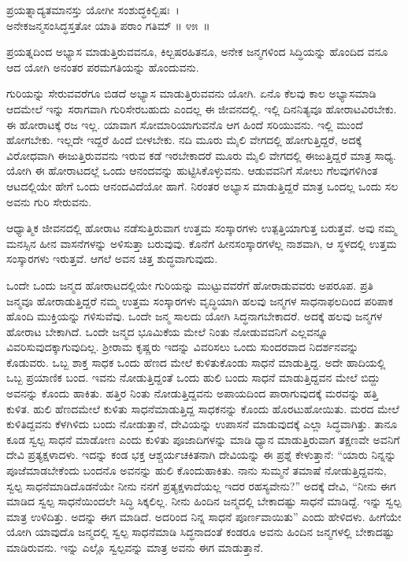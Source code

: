 \begin{shloka}
ಪ್ರಯತ್ನಾದ್ಯತಮಾನಸ್ತು ಯೋಗೀ ಸಂಶುದ್ಧಕಿಲ್ಬಿಷಃ~।\\ಅನೇಕಜನ್ಮಸಂಸಿದ್ಧಸ್ತತೋ ಯಾತಿ ಪರಾಂ ಗತಿಮ್ \hfill॥ ೪೫~॥ 
\end{shloka}

\begin{artha}
ಪ್ರಯತ್ನದಿಂದ ಅಭ್ಯಾಸ ಮಾಡುತ್ತಿರುವವನೂ, ಕಿಲ್ಬಷರಹಿತನೂ, ಅನೇಕ ಜನ್ಮಗಳಿಂದ ಸಿದ್ಧಿಯನ್ನು ಹೊಂದಿದ ವನೂ ಆದ ಯೋಗಿ ಅನಂತರ ಪರಮಗತಿಯನ್ನು ಹೊಂದುವನು.
\end{artha}

ಗುರಿಯನ್ನು ಸೇರುವವರೆಗೂ ಬಿಡದೆ ಅಭ್ಯಾಸ ಮಾಡುತ್ತಿರುವವನು ಯೋಗಿ. ಏನೊ ಕೆಲವು ಕಾಲ ಅಭ್ಯಾಸಮಾಡಿ ಆದಮೇಲೆ ಇನ್ನು ಸರಾಗವಾಗಿ ಗುರಿಸೇರಬಹುದು ಎಂದಲ್ಲ ಈ ಜೀವನದಲ್ಲಿ. ಇಲ್ಲಿ ದಿನನಿತ್ಯವೂ ಹೋರಾಟವಿರಬೇಕು. ಈ ಹೋರಾಟಕ್ಕೆ ರಜ ಇಲ್ಲ. ಯಾವಾಗ ಸೋಮಾರಿಯಾಗುವನೊ ಆಗ ಹಿಂದೆ ಸರಿಯುವನು. ಇಲ್ಲಿ ಮುಂದೆ ಹೋಗಬೇಕು. ಇಲ್ಲದೇ ಇದ್ದರೆ ಹಿಂದೆ ಬೀಳಬೇಕು. ನದಿ ಮೂರು ಮೈಲಿ ವೇಗದಲ್ಲಿ ಹೋಗುತ್ತಿದ್ದರೆ, ಅದಕ್ಕೆ ವಿರೋಧವಾಗಿ ಈಜುತ್ತಿರುವವನು ಇರುವ ಕಡೆ ಇರಬೇಕಾದರೆ ಮೂರು ಮೈಲಿ ವೇಗದಲ್ಲಿ ಈಜುತ್ತಿದ್ದರೆ ಮಾತ್ರ ಸಾಧ್ಯ. ಯೋಗಿ ಈ ಹೋರಾಟದಲ್ಲೆ ಒಂದು ಆನಂದವನ್ನು ಹುಟ್ಟಿಸಿಕೊಳ್ಳುವನು. ಆಡುವವನಿಗೆ ಸೋಲು ಗೆಲವುಗಳಿಗಿಂತ ಆಟದಲ್ಲಿಯೇ ಹೇಗೆ ಒಂದು ಆನಂದವಿದೆಯೋ ಹಾಗೆ. ನಿರಂತರ ಅಭ್ಯಾಸ ಮಾಡುತ್ತಿದ್ದರೆ ಮಾತ್ರ ಒಂದಲ್ಲ ಒಂದು ಸಲ ಅವನು ಗುರಿ ಸೇರುವನು.

ಆಧ್ಯಾತ್ಮಿಕ ಜೀವನದಲ್ಲಿ ಹೋರಾಟ ನಡೆಸುತ್ತಿರುವಾಗ ಉತ್ತಮ ಸಂಸ್ಕಾರಗಳು ಉತ್ಪತ್ತಿಯಾಗುತ್ತ ಬರುತ್ತವೆ. ಅವು ನಮ್ಮ ಮನಸ್ಸಿನ ಹೀನ ವಾಸನೆಗಳನ್ನು ಅಳಿಸುತ್ತಾ ಬರುವುವು. ಕೊನೆಗೆ ಹೀನಸಂಸ್ಕಾರಗಳೆಲ್ಲ ನಾಶವಾಗಿ, ಆ ಸ್ಥಳದಲ್ಲಿ ಉತ್ತಮ ಸಂಸ್ಕಾರಗಳು ಇರುತ್ತವೆ. ಆಗಲೆ ಅವನ ಚಿತ್ತ ಶುದ್ಧವಾಗುವುದು. 

ಒಂದೇ ಒಂದು ಜನ್ಮದ ಹೋರಾಟದಲ್ಲಿಯೇ ಗುರಿಯನ್ನು ಮುಟ್ಟುವವರೆಗೆ ಹೋರಾಡುವವರು ಅಪರೂಪ. ಪ್ರತಿ ಜನ್ಮವೂ ಹೋರಾಡುತ್ತಿದ್ದರೆ ನಮ್ಮ ಉತ್ತಮ ಸಂಸ್ಕಾರಗಳು ವೃದ್ಧಿಯಾಗಿ ಹಲವು ಜನ್ಮಗಳ ಸಾಧನಾಫಲದಿಂದ ಪರಿಪಾಕ ಹೊಂದಿ ಮುಕ್ತಿಯನ್ನು ಗಳಿಸುವೆವು. ಒಂದೇ ಜನ್ಮ ಸಾಲದು ಯೋಗಿ ಸಿದ್ಧನಾಗಬೇಕಾದರೆ. ಅದಕ್ಕೆ ಹಲವು ಜನ್ಮಗಳ ಹೋರಾಟ ಬೇಕಾಗಿದೆ. ಒಂದೇ ಜನ್ಮದ ಭೂಮಿಕೆಯ ಮೇಲೆ ನಿಂತು ನೋಡುವವನಿಗೆ ಎಲ್ಲವನ್ನೂ ವಿವರಿಸುವುದಕ್ಕಾಗುವುದಿಲ್ಲ. ಶ‍್ರೀರಾಮ ಕೃಷ್ಣರು ಇದನ್ನು ವಿವರಿಸಲು ಒಂದು ಸುಂದರವಾದ ನಿದರ್ಶನವನ್ನು ಕೊಡುವರು. ಒಬ್ಬ ಶಾಕ್ತ ಸಾಧಕ ಒಂದು ಹೆಣದ ಮೇಲೆ ಕುಳಿತುಕೊಂಡು ಸಾಧನೆ ಮಾಡುತ್ತಿದ್ದ. ಅದೇ ಹಾದಿಯಲ್ಲಿ ಒಬ್ಬ ಪ್ರಯಾಣಿಕ ಬಂದ. ಇವನು ನೋಡುತ್ತಿದ್ದಂತೆ ಒಂದು ಹುಲಿ ಬಂದು ಸಾಧನೆ ಮಾಡುತ್ತಿದ್ದವನ ಮೇಲೆ ಬಿದ್ದು ಅವನನ್ನು ಕೊಂದು ಹಾಕಿತು. ಹತ್ತಿರ ನಿಂತು ನೋಡುತ್ತಿದ್ದವನು ಅಪಾಯದಿಂದ ಪಾರಾಗುವುದಕ್ಕೆ ಮರವನ್ನು ಹತ್ತಿ ಕುಳಿತ. ಹುಲಿ ಹೆಣದಮೇಲೆ ಕುಳಿತು ಸಾಧನೆಮಾಡುತ್ತಿದ್ದ ಸಾಧಕನನ್ನು ಕೊಂದು ಹೊರಟುಹೋಯಿತು. ಮರದ ಮೇಲೆ ಕುಳಿತಿದ್ದವನು ಕೆಳಗಿಳಿದು ಬಂದು ನೋಡುತ್ತಾನೆ, ದೇವಿಯನ್ನು ಉಪಾಸನೆ ಮಾಡುವುದಕ್ಕೆ ಎಲ್ಲಾ ಸಿದ್ಧವಾಗಿತ್ತು. ತಾನೂ ಕೂಡ ಸ್ವಲ್ಪ ಸಾಧನೆ ಮಾಡೋಣ ಎಂದು ಕುಳಿತು ಪೂಜಾದಿಗಳನ್ನು ಮಾಡಿ ಧ್ಯಾನ ಮಾಡುತ್ತಿರುವಾಗ ತಕ್ಷಣವೇ ಅವನಿಗೆ ದೇವಿ ಪ್ರತ್ಯಕ್ಷಳಾದಳು. ಇದನ್ನು ಕಂಡ ಭಕ್ತ ಆಶ್ಚರ್ಯಚಕಿತನಾಗಿ ದೇವಿಯನ್ನು ಈ ಪ್ರಶ್ನೆ ಕೇಳುತ್ತಾನೆ: “ಯಾರು ನಿನ್ನನ್ನು ಪೂಜೆಮಾಡಬೇಕೆಂದು ಬಂದನೊ ಅವನನ್ನು ಹುಲಿ ಕೊಂದುಹಾಕಿತು. ನಾನು ಸುಮ್ಮನೆ ತಮಾಷೆ ನೋಡುತ್ತಿದ್ದವನು, ಸ್ವಲ್ಪ ಸಾಧನೆಮಾಡಿದೊಡನೆಯೇ ನೀನು ನನಗೆ ಪ್ರತ್ಯಕ್ಷಳಾದೆಯಲ್ಲ ಇದರ ರಹಸ್ಯವೇನು?” ಅದಕ್ಕೆ ದೇವಿ, “ನೀನು ಈಗ ಮಾಡಿದ ಸ್ವಲ್ಪ ಸಾಧನೆಯಿಂದಲೇ ಸಿದ್ಧಿ ಸಿಕ್ಕಲಿಲ್ಲ. ನೀನು ಹಿಂದಿನ ಜನ್ಮದಲ್ಲಿ ಬೇಕಾದಷ್ಟು ಸಾಧನೆ ಮಾಡಿದ್ದೆ. ಇನ್ನು ಸ್ವಲ್ಪ ಮಾತ್ರ ಉಳಿದಿತ್ತು. ಅದನ್ನು ಈಗ ಮಾಡಿದೆ. ಅದರಿಂದ ನಿನ್ನ ಸಾಧನೆ ಪೂರ್ಣವಾಯಿತು” ಎಂದು ಹೇಳಿದಳು. ಹೀಗೆಯೇ ಯೋಗಿ ಯಾವುದೊ ಜನ್ಮದಲ್ಲಿ ಸ್ವಲ್ಪ ಸಾಧನೆಮಾಡಿ ಸಿದ್ಧನಾದಂತೆ ಕಂಡರೂ ಅವನು ಹಿಂದಿನ ಜನ್ಮಗಳಲ್ಲಿ ಬೇಕಾದಷ್ಟು ಮಾಡಿರುವನು. ಇನ್ನು ಎಲ್ಲೊ ಸ್ವಲ್ಪವನ್ನು ಮಾತ್ರ ಅವನು ಈಗ ಮಾಡುತ್ತಾನೆ.

